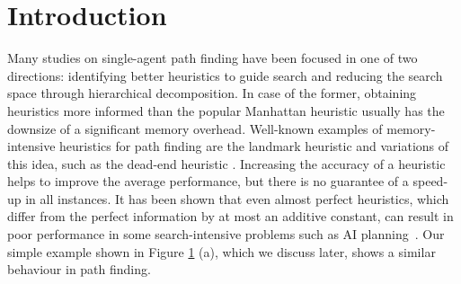 \section{Introduction}
Many studies on single-agent path finding have been focused in one of two directions:
identifying better heuristics to 
guide search and reducing the search space through hierarchical decomposition.
In case of the former, obtaining heuristics more informed than the popular
Manhattan heuristic usually has the downsize of a significant memory overhead.
Well-known examples of memory-intensive heuristics for path finding are
the landmark heuristic \cite{} and variations of this idea, such as the dead-end heuristic \cite{}.
Increasing the accuracy of a heuristic helps to improve the average performance,
but there is no guarantee of a speed-up in all instances.
It has been shown that even almost perfect heuristics,
which differ from the perfect information by at most an additive constant,
can result in poor performance in some search-intensive problems such as AI planning~\cite{malte08,korf98}.
Our simple example shown in Figure \ref{} (a), which we discuss later,
shows a similar behaviour in path finding.

